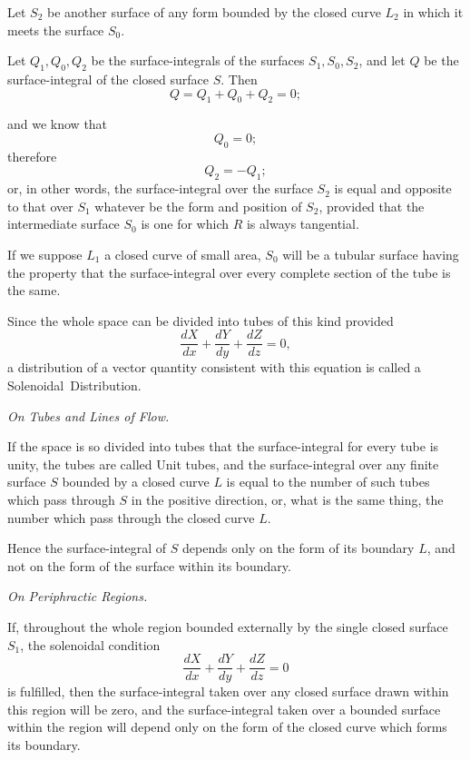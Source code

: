 \documentclass[11pt,a4paper]{article}
\begin{document}
Let \(S_2\) be another surface of any form bounded by the closed curve
\(L_2\) in which it meets the surface \(S_0\).

Let \(Q_1,Q_0,Q_2\) be the surface-integrals of the surfaces
\(S_1,S_0,S_2\), and let \(Q\) be the surface-integral of the closed
surface \(S\). Then
\[
Q=Q_1+Q_0+Q_2=0;
\tag{13}
\]

\clearpage

and we know that
\[
Q_0=0;
\tag{14}
\]
therefore
\[
Q_2=-Q_1;
\tag{15}
\]
or, in other words, the surface-integral over the surface \(S_2\) is
equal and opposite to that over \(S_1\) whatever be the form and
position of \(S_2\), provided that the intermediate surface \(S_0\) is
one for which \(R\) is always tangential.

If we suppose \(L_1\) a closed curve of small area, \(S_0\) will be a
tubular surface having the property that the surface-integral over every
complete section of the tube is the same.

Since the whole space can be divided into tubes of this kind provided
\[
\frac{dX}{dx}+\frac{dY}{dy}+\frac{dZ}{dz}=0,
\tag{16}
\]
a distribution of a vector quantity consistent with this equation is
called a \mbox{Solenoidal Distribution}.

\begin{center}
\textit{On Tubes and Lines of Flow.}
\end{center}

If the space is so divided into tubes that the surface-integral for
every tube is unity, the tubes are called Unit tubes, and the
surface-integral over any finite surface \(S\) bounded by a closed curve
\(L\) is equal to the number of such tubes which pass through \(S\) in
the positive direction, or, what is the same thing, the number which
pass through the closed curve \(L\).

Hence the surface-integral of \(S\) depends only on the form of its
boundary \(L\), and not on the form of the surface within its boundary.

\begin{center}
\textit{On Periphractic Regions.}
\end{center}

If, throughout the whole region bounded externally by the single closed
surface \(S_1\), the solenoidal condition
\[
\frac{dX}{dx}+\frac{dY}{dy}+\frac{dZ}{dz}=0
\]
is fulfilled, then the surface-integral taken over any closed surface
drawn within this region will be zero, and the surface-integral taken
over a bounded surface within the region will depend only on the form of
the closed curve which forms its boundary.
\end{document}
